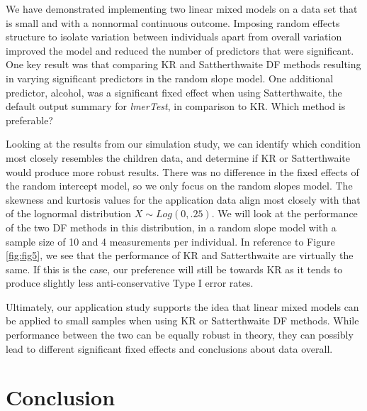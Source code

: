 \documentclass[12pt, twoside]{amherstthesis}
\begin{document}
We have demonstrated implementing two linear mixed models on a data set that is small and with a nonnormal continuous outcome. Imposing random effects structure to isolate variation between individuals apart from overall variation improved the model and reduced the number of predictors that were significant. One key result was that comparing KR and Sattherthwaite DF methods resulting in varying significant predictors in the random slope model. One additional predictor, alcohol, was a significant fixed effect when using Satterthwaite, the default output summary for \emph{lmerTest}, in comparison to KR. Which method is preferable?

Looking at the results from our simulation study, we can identify which condition most closely resembles the children data, and determine if KR or Satterthwaite would produce more robust results. There was no difference in the fixed effects of the random intercept model, so we only focus on the random slopes model. The skewness and kurtosis values for the application data align most closely with that of the lognormal distribution \(X\sim\mathit{Log}(0,.25).\) We will look at the performance of the two DF methods in this distribution, in a random slope model with a sample size of 10 and 4 measurements per individual. In reference to Figure \ref{fig:fig5}, we see that the performance of KR and Satterthwaite are virtually the same. If this is the case, our preference will still be towards KR as it tends to produce slightly less anti-conservative Type I error rates.

Ultimately, our application study supports the idea that linear mixed models can be applied to small samples when using KR or Satterthwaite DF methods. While performance between the two can be equally robust in theory, they can possibly lead to different significant fixed effects and conclusions about data overall.

\hypertarget{conclusion-1}{%
\chapter*{Conclusion}\label{conclusion-1}}
\end{document}
